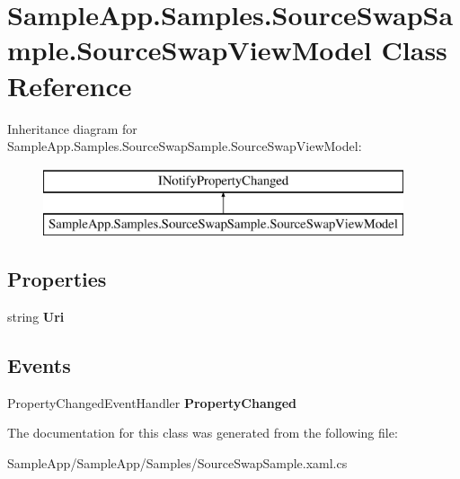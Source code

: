 \hypertarget{class_sample_app_1_1_samples_1_1_source_swap_sample_1_1_source_swap_view_model}{}\section{Sample\+App.\+Samples.\+Source\+Swap\+Sample.\+Source\+Swap\+View\+Model Class Reference}
\label{class_sample_app_1_1_samples_1_1_source_swap_sample_1_1_source_swap_view_model}
Inheritance diagram for Sample\+App.\+Samples.\+Source\+Swap\+Sample.\+Source\+Swap\+View\+Model\+:\begin{figure}[H]
\begin{center}
\leavevmode
\includegraphics[height=2.000000cm]{class_sample_app_1_1_samples_1_1_source_swap_sample_1_1_source_swap_view_model}
\end{center}
\end{figure}
\subsection*{Properties}
\begin{DoxyCompactItemize}
\item 
\mbox{\label{class_sample_app_1_1_samples_1_1_source_swap_sample_1_1_source_swap_view_model_afdda3b8eec9f741d188e3316cb7acc77}} 
string {\bfseries Uri}
\end{DoxyCompactItemize}
\subsection*{Events}
\begin{DoxyCompactItemize}
\item 
\mbox{\label{class_sample_app_1_1_samples_1_1_source_swap_sample_1_1_source_swap_view_model_a1d26b8790f9f2bb96495da12c0dd295a}} 
Property\+Changed\+Event\+Handler {\bfseries Property\+Changed}
\end{DoxyCompactItemize}


The documentation for this class was generated from the following file\+:\begin{DoxyCompactItemize}
\item 
Sample\+App/\+Sample\+App/\+Samples/Source\+Swap\+Sample.\+xaml.\+cs\end{DoxyCompactItemize}
